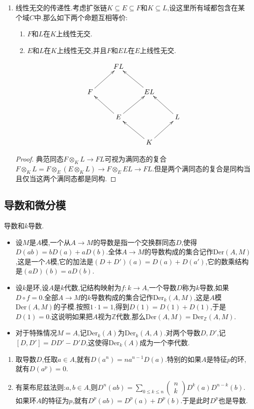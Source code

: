 \begin{enumerate}
\begin{proof}
    	设$F/K$是代数扩张,设$L/K$是纯超越扩张,我们要证明$F$和$L$在$K$上线性无交.设$L/K$的一组超越基为$X$,那么$L=K(X)$,那么$K[X]$是商域为$L$的环,于是归结为证明$F$和$K[X]$在$K$上线性无交.那么$F$和$K[X]$的合成域就是$F[X]$,所以我们要证的是典范同态$F\otimes_KK[X]\to F[X]$是同构,而这是因为它有逆映射$ax\mapsto a\otimes x$,其中$a\in F$.
    \end{proof}
    \item 线性无交的传递性.考虑扩张链$K\subseteq E\subseteq F$和$K\subseteq L$,设这里所有域都包含在某个域$C$中.那么如下两个命题互相等价:
    \begin{enumerate}
    	\item $F$和$L$在$K$上线性无交.
    	\item $E$和$L$在$K$上线性无交,并且$F$和$EL$在$E$上线性无交.
    \end{enumerate}
    $$\xymatrix{&FL&&\\F\ar[ur]&&EL\ar[ul]&\\&E\ar[ul]\ar[ur]&&L\ar[ul]\\&&K\ar[ul]\ar[ur]&}$$
    \begin{proof}
    	
    	典范同态$F\otimes_KL\to FL$可视为满同态的复合$F\otimes_KL=F\otimes_E(E\otimes_KL)\to F\otimes_EEL\to FL$.但是两个满同态的复合是同构当且仅当这两个满同态都是同构.
    \end{proof}
\end{enumerate}
\newpage
\subsection{导数和微分模}

导数和$k$导数.
\begin{itemize}
	\item 设$M$是$A$模,一个从$A\to M$的导数是指一个交换群同态$D$,使得$D(ab)=bD(a)+aD(b)$.全体$A\to M$的导数构成的集合记作$\mathrm{Der}(A,M)$,这是一个$A$模,它的加法是$(D+D')(a)=D(a)+D(a')$,它的数乘结构是$(aD)(b)=aD(b)$.
	\item 设$k$是环,设$A$是$k$代数,记结构映射为$f:k\to A$,一个导数$D$称为$k$导数,如果$D\circ f=0$.全部$A\to M$的$k$导数构成的集合记作$\mathrm{Der}_k(A,M)$,这是$A$模$\mathrm{Der}(A,M)$的子模.按照$1\cdot1=1$,得到$D(1)=D(1)+D(1)$,于是$D(1)=0$.这说明如果把$A$视为$\mathbb{Z}$代数,那么$\mathrm{Der}(A,M)=\mathrm{Der}_{\mathbb{Z}}(A,M)$.
	\item 对于特殊情况$M=A$,记$\mathrm{Der}_k(A)$为$\mathrm{Der}_k(A,A)$.对两个导数$D,D'$,记$[D,D']=DD'-D'D$,这使得$\mathrm{Der}_k(A)$成为一个李代数.
\end{itemize}
\begin{enumerate}
	\item 取导数$D$,任取$a\in A$,就有$D(a^n)=na^{n-1}D(a)$.特别的如果$A$是特征$p$的环,就有$D(a^p)=0$.
	\item 有莱布尼兹法则:$a,b\in A$,则$D^n(ab)=\sum_{0\le k\le n}\left(\begin{array}{c}n\\k\end{array}\right)D^k(a)D^{n-k}(b)$.如果环$A$的特征为$p$,就有$D^p(ab)=D^p(a)+D^p(b)$.于是此时$D^p$也是导数.
\end{enumerate}

